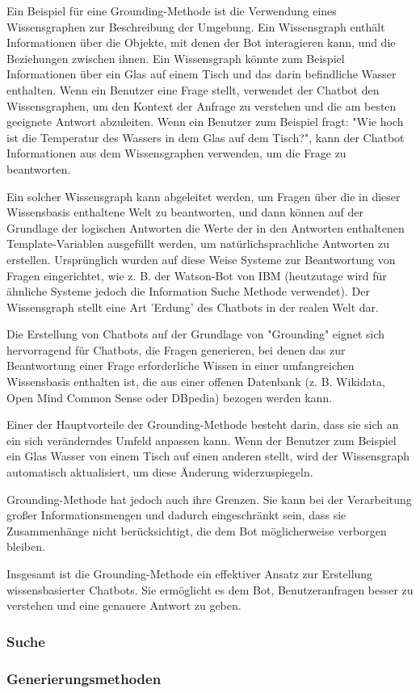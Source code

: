 Ein Beispiel für eine Grounding-Methode ist die Verwendung eines Wissensgraphen zur Beschreibung der Umgebung. Ein Wissensgraph enthält Informationen über die Objekte, mit denen der Bot interagieren kann, und die Beziehungen zwischen ihnen. Ein Wissensgraph könnte zum Beispiel Informationen über ein Glas auf einem Tisch und das darin befindliche Wasser enthalten. Wenn ein Benutzer eine Frage stellt, verwendet der Chatbot den Wissensgraphen, um den Kontext der Anfrage zu verstehen und die am besten geeignete Antwort abzuleiten. Wenn ein Benutzer zum Beispiel fragt: "Wie hoch ist die Temperatur des Wassers in dem Glas auf dem Tisch?", kann der Chatbot Informationen aus dem Wissensgraphen verwenden, um die Frage zu beantworten. 

Ein solcher Wissensgraph kann abgeleitet werden, um Fragen über die in dieser Wissensbasis enthaltene Welt zu beantworten, und dann können auf der Grundlage der logischen Antworten die Werte der in den Antworten enthaltenen Template-Variablen ausgefüllt werden, um natürlichsprachliche Antworten zu erstellen. Ursprünglich wurden auf diese Weise Systeme zur Beantwortung von Fragen eingerichtet, wie z. B. der Watson-Bot von IBM (heutzutage wird für ähnliche Systeme jedoch die Information Suche Methode verwendet). Der Wissensgraph stellt eine Art 'Erdung' des Chatbots in der realen Welt dar.

Die Erstellung von Chatbots auf der Grundlage von "Grounding" eignet sich hervorragend für Chatbots, die Fragen generieren, bei denen das zur Beantwortung einer Frage erforderliche Wissen in einer umfangreichen Wissensbasis enthalten ist, die aus einer offenen Datenbank (z. B. Wikidata, Open Mind Common Sense oder DBpedia) bezogen werden kann.

Einer der Hauptvorteile der Grounding-Methode besteht darin, dass sie sich an ein sich veränderndes Umfeld anpassen kann. Wenn der Benutzer zum Beispiel ein Glas Wasser von einem Tisch auf einen anderen stellt, wird der Wissensgraph automatisch aktualisiert, um diese Änderung widerzuspiegeln.

Grounding-Methode hat jedoch auch ihre Grenzen. Sie kann bei der Verarbeitung großer Informationsmengen und dadurch eingeschränkt sein, dass sie Zusammenhänge nicht berücksichtigt, die dem Bot möglicherweise verborgen bleiben.

Insgesamt ist die Grounding-Methode ein effektiver Ansatz zur Erstellung wissensbasierter Chatbots. Sie ermöglicht es dem Bot, Benutzeranfragen besser zu verstehen und eine genauere Antwort zu geben.
\subsubsection{Suche}
\subsubsection{Generierungsmethoden}
\endinput